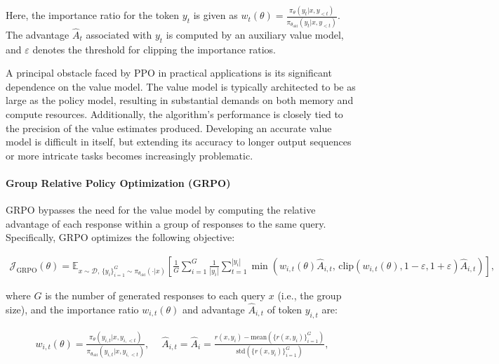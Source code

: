 Here, the importance ratio for the token $y_t$ is given as $
w_{t}(\theta) = \frac{ \pi_{\theta} (y_{t} | x, y_{<t}) }{ \pi_{\theta_\text{old}} (y_{t} | x,y_{<t})} $. The advantage $\widehat{A}_{t}$ associated with $y_t$ is computed by an auxiliary value model, and $\varepsilon$ denotes the threshold for clipping the importance ratios.

A principal obstacle faced by PPO in practical applications is its significant dependence on the value model. The value model is typically architected to be as large as the policy model, resulting in substantial demands on both memory and compute resources. Additionally, the algorithm's performance is closely tied to the precision of the value estimates produced. Developing an accurate value model is difficult in itself, but extending its accuracy to longer output sequences or more intricate tasks becomes increasingly problematic.

\paragraph{Group Relative Policy Optimization (GRPO)} GRPO \citep{grpo} bypasses the need for the value model by computing the relative advantage of each response within a group of responses to the same query. Specifically, GRPO optimizes the following objective:

\begin{align}
\label{equ:grpo}
\mathcal{J}_\text{GRPO}(\theta) = \mathbb{E}_{ x \sim \mathcal{D},\, \{y_i\}_{i=1}^G \sim \pi_{\theta_\text{old}}( \cdot | x) }
\left[ \frac{1}{G} \sum_{i=1}^{G} \frac{1}{|y_i|} \sum_{t=1}^{|y_i|} 
\min \left( w_{i,t}(\theta) \widehat{A}_{i,t},  \, \mathrm{clip} \left( w_{i,t}(\theta), 1 - {\varepsilon}, 1 + {\varepsilon}\right) \widehat{A}_{i,t} \right)
\right],
\end{align}

where $G$ is the number of generated responses to each query $x$ (i.e., the group size), and the importance ratio $w_{i,t}(\theta)$ and advantage $\widehat{A}_{i,t}$ of token $y_{i,t}$ are:

\begin{align}
    w_{i,t}(\theta)=\frac{ \pi_{\theta} (y_{i,t} | x, y_{i,<t}) }{ \pi_{\theta_\text{old}} (y_{i,t} | x,y_{i,<t})},\quad\ 
    \widehat{A}_{i,t} = \widehat{A}_{i} = \frac{r(x, y_i) - \mathrm{mean} \left( \{ r(x, y_i) \}_{i=1}^G \right) }{ \mathrm{std} \left( \{ r(x, y_i) \}_{i=1}^G \right) },
\end{align}


